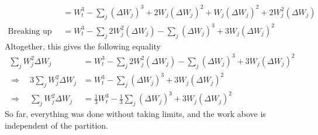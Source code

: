 \documentclass[12pt]{article}
\theoremstyle{plain}
\theoremstyle{definition}
\theoremstyle{remark}
\begin{document}
\begin{enumerate}
\begin{enumerate}
\begin{align*}
        &= W^3_t
          - \sum_j
            (\Delta W_{j})^3
            + 2 W_j (\Delta W_j)^2
            + W_j(\Delta W_j)^2
            + 2 W_j^2 (\Delta W_j)\\
        \text{Breaking up} \qquad
        &= W^3_t
          - \sum_j 2 W_j^2 (\Delta W_j)
          - \sum_j
            (\Delta W_{j})^3
            + 3 W_j (\Delta W_j)^2
      \end{align*}
      Altogether, this gives the following equality
      \begin{align*}
        \sum_j W_j^2 \Delta W_j
        &= W^3_t
          - \sum_j 2 W_j^2 (\Delta W_j)
          - \sum_j
            (\Delta W_{j})^3
            + 3 W_j (\Delta W_j)^2 \\
        \Rightarrow\quad
        3\sum_j W_j^2 \Delta W_j
        &= W^3_t
          - \sum_j
            (\Delta W_{j})^3
            + 3 W_j (\Delta W_j)^2 \\
        \Rightarrow\quad
        \sum_j W_j^2 \Delta W_j
        &= \frac{1}{3}W^3_t
          - \frac{1}{3}\sum_j
            (\Delta W_{j})^3
            + 3 W_j (\Delta W_j)^2
      \end{align*}
      So far, everything was done without taking limits, and the work
      above is independent of the partition.


\end{enumerate}
\end{enumerate}
\end{document}
